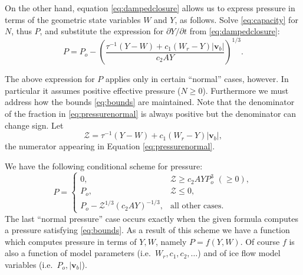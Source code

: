 \documentclass[12pt,final]{amsart}%
\newcommand\bv{\mathbf{v}}
\begin{document}
On the other hand, equation \eqref{eq:dampedclosure} allows us to express pressure in terms of the geometric state variables $W$ and $Y$, as follows.  Solve \eqref{eq:capacity} for $N$, thus $P$, and substitute the expression for $\partial Y/\partial t$ from \eqref{eq:dampedclosure}:
\begin{equation}
P = P_o - \left(\frac{\tau^{-1} (Y-W) + c_1 \left(W_r - Y\right) |\bv_b|}{c_2 A Y}\right)^{1/3}.  \label{eq:pressurenormal}
\end{equation}

The above expression for $P$ applies only in certain ``normal'' cases, however.  In particular it assumes positive effective pressure ($N\ge 0$).  Furthermore we must address how the bounds \eqref{eq:bounds} are maintained.  Note that the denominator of the fraction in \eqref{eq:pressurenormal} is always positive but the denominator can change sign.  Let
\begin{equation}
\mathcal{Z} = \tau^{-1} (Y-W) + c_1 \left(W_r - Y\right) |\bv_b|, \label{eq:Znumerator}
\end{equation}
the numerator appearing in Equation \eqref{eq:pressurenormal}.

We have the following conditional scheme for pressure:
\begin{equation}
P = \begin{cases}
0, & \mathcal{Z} \ge c_2 A Y P_o^3\,\, (\ge 0) , \\
P_o, & \mathcal{Z} \le 0, \\
P_o - \mathcal{Z}^{1/3} (c_2 A Y)^{-1/3}, & \text{all other cases}.
\end{cases} \label{eq:pressureWY}
\end{equation}
The last ``normal pressure'' case occurs exactly when the given formula computes a pressure satisfying \eqref{eq:bounds}.  As a result of this scheme we have a function which computes pressure in terms of $Y,W$, namely $P = f(Y,W)$.  Of course $f$ is also a function of model parameters (i.e.~$W_r,c_1,c_2,\dots$) and of ice flow model variables (i.e.~$P_o,|\bv_b|$).
\end{document}

